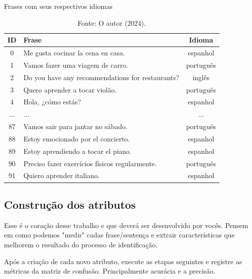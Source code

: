 \begin{table}[H]
\centering
\caption{Frases com seus respectivos idiomas}
\begin{tabular}{|c|p{9cm}|c|}
\hline
\textbf{ID} & \textbf{Frase} & \textbf{Idioma} \\
\hline
0 & Me gusta cocinar la cena en casa. & espanhol \\
1 & Vamos fazer uma viagem de carro. & português \\
2 & Do you have any recommendations for restaurants? & inglês \\
3 & Quero aprender a tocar violão. & português \\
4 & Hola, ¿cómo estás? & espanhol \\
\hline
... & ... & ... \\
\hline
87 & Vamos sair para jantar no sábado. & português \\
88 & Estoy emocionado por el concierto. & espanhol \\
89 & Estoy aprendiendo a tocar el piano. & espanhol \\
90 & Preciso fazer exercícios físicos regularmente. & português \\
91 & Quiero aprender italiano. & espanhol \\
\hline
\end{tabular}
\vspace{0.5em}
\caption*{Fonte: O autor (2024).}
\label{tab:frases_idiomas}
\end{table}


\subsection*{\textbf{Construção dos atributos}}

Esse é o coração desse trabalho e que deverá ser desenvolvido por vocês. Pensem em como podemos "medir" cadas frase/sentença e extrair características que melhorem o resultado do processo de identificação.


Após a criação de cada novo atributo, execute as etapas seguintes e registre as métricas da matriz de confusão. Principalmente acurácia e a precisão.


